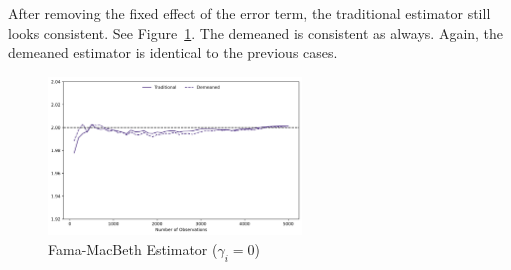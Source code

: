 \documentclass[12pt,twoside]{article}
\begin{document}
\begin{enumerate}[label = (\alph*)]
    \begin{solution}
        After removing the fixed effect of the error term, the traditional estimator still looks consistent. See Figure~\ref{fig:beta_fm_c}. The demeaned is consistent as always. Again, the demeaned estimator is identical to the previous cases.
        \begin{figure}[!htbp]
            \centering
            \includegraphics[width=0.6\textwidth]{images/beta_fm_c}
            \caption{Fama-MacBeth Estimator (\(\gamma_i = 0\))}
            \label{fig:beta_fm_c}
        \end{figure}
    \end{solution}


\end{enumerate}
\end{document}

